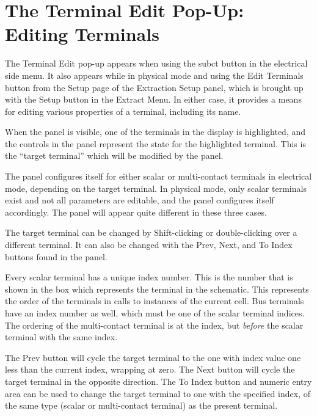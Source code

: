 \section{The {\cb Terminal Edit} Pop-Up:  Editing Terminals}
\label{termedit}

The {\cb Terminal Edit} pop-up appears when using the {\cb subct}
button in the electrical side menu.  It also appears while in physical
mode and using the {\cb Edit Terminals} button from the {\cb Setup}
page of the {\cb Extraction Setup} panel, which is brought up with the
{\cb Setup} button in the {\cb Extract Menu}.  In either case, it
provides a means for editing various properties of a terminal,
including its name.

When the panel is visible, one of the terminals in the display is
highlighted, and the controls in the panel represent the state for the
highlighted terminal.  This is the ``target terminal'' which will be
modified by the panel.

The panel configures itself for either scalar or multi-contact
terminals in electrical mode, depending on the target terminal.  In
physical mode, only scalar terminals exist and not all parameters are
editable, and the panel configures itself accordingly.  The panel will
appear quite different in these three cases.

The target terminal can be changed by {\kb Shift}-clicking or
double-clicking over a different terminal.  It can also be changed
with the {\cb Prev}, {\cb Next}, and {\cb To Index} buttons found in
the panel.

Every scalar terminal has a unique index number.  This is the number
that is shown in the box which represents the terminal in the
schematic.  This represents the order of the terminals in calls to
instances of the current cell.  Bus terminals have an index number as
well, which must be one of the scalar terminal indices.  The ordering
of the multi-contact terminal is at the index, but {\it before} the
scalar terminal with the same index.

The {\cb Prev} button will cycle the target terminal to the one with
index value one less than the current index, wrapping at zero.  The
{\cb Next} button will cycle the target terminal in the opposite
direction.  The {\cb To Index} button and numeric entry area can be
used to change the target terminal to one with the specified index, of
the same type (scalar or multi-contact terminal) as the present
terminal. 


